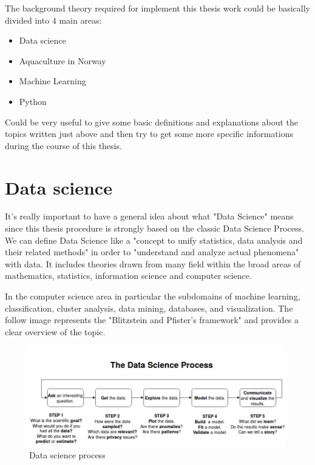 

The background theory required for implement this thesis work could be basically divided into 4 main areas:
\begin{itemize}
\item Data science
\item Aquaculture in Norway
\item Machine Learning
\item Python
\end{itemize}

Could be very useful to give some basic definitions and explanations about the topics written just above and then try to get some more specific informations during the course of this thesis.

\newpage
\section{Data science}
It's really important to have a general idea about what "Data Science" means since this thesis procedure is strongly based on the classic Data Science Process.
We can define Data Science like a "concept to unify statistics, data analysis and their related methods" in order to "understand and analyze actual phenomena" with data.
It includes theories drawn from many field within the broad areas of mathematics, statistics, information science and computer science.

In the computer science area in particular the subdomains of machine learning, classification, cluster analysis, data mining, databases, and visualization.
The follow image represents the "Blitzstein and Pfister's framework" and provides a clear overview of the topic.

\begin{figure}[h]
    \centering
    \includegraphics[trim=0cm 0cm 0cm 0cm, clip=true, width=1\textwidth,natwidth=819,natheight=321]{Files/Data_Science_Process.png}
    \caption[Data science process]{Data science process}
    \label{fig: Data_science}
\end{figure}

